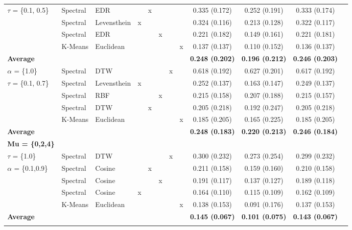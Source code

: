 \begin{table}[!htbp]
{\begin{tabular}{@{\extracolsep{0pt}} lllccccccccc}
			$\tau$ =  \{0.1, 0.5\} & Spectral & EDR &  & x &  &  &  & 0.335 (0.172) & 0.252 (0.191) & 0.333 (0.174) \\ 
			& Spectral & Levensthein & x &  &  &  &  & 0.324 (0.116) & 0.213 (0.128) & 0.322 (0.117) \\ 
			& Spectral & EDR &  &  & x &  &  & 0.221 (0.182) & 0.149 (0.161) & 0.221 (0.181) \\ 
			& K-Means & Euclidean &  &  &  &  & x & 0.137 (0.137) & 0.110 (0.152) & 0.136 (0.137) \\ 
			\hline
			\textbf{Average}  &  &  &  &  &  &  &  &  \textbf{0.248 (0.202)} &  \textbf{0.196 (0.212)} &  \textbf{0.246 (0.203)} \\ 
			\hline
			$\alpha$ = \{1.0\} & Spectral & DTW &  &  &  & x &  & 0.618 (0.192) & 0.627 (0.201) & 0.617 (0.192) \\ 
			$\tau$ = \{0.1, 0.7\} & Spectral & Levensthein & x &  &  &  &  & 0.252 (0.137) & 0.163 (0.147) & 0.249 (0.137) \\ 
			& Spectral & RBF &  &  & x &  &  & 0.215 (0.158) & 0.207 (0.188) & 0.215 (0.157) \\ 
			& Spectral & DTW &  & x &  &  &  & 0.205 (0.218) & 0.192 (0.247) & 0.205 (0.218) \\ 
			& K-Means & Euclidean &  &  &  &  & x & 0.185 (0.205) & 0.165 (0.225) & 0.185 (0.205) \\ 
			\hline
			\textbf{Average} &  &  &  &  &  &  &  &  \textbf{0.248 (0.183)} &  \textbf{0.220 (0.213)} &  \textbf{0.246 (0.184)} \\ 
			\hline
			\textbf{Mu = \{0,2,4\}}\tnote{*} &  &  &  &  &  &  &  &  &  &  \\ 
			\hline
			$\tau$ = \{1.0\}  & Spectral & DTW &  &  &  & x &  & 0.300 (0.232) & 0.273 (0.254) & 0.299 (0.232) \\ 
			$\alpha$ = \{0.1,0.9\} & Spectral & Cosine &  & x &  &  &  & 0.211 (0.158) & 0.159 (0.160) & 0.210 (0.158) \\ 
			& Spectral & Cosine &  &  & x &  &  & 0.191 (0.117) & 0.137 (0.127) & 0.189 (0.118) \\ 
			& Spectral & Cosine & x &  &  &  &  & 0.164 (0.110) & 0.115 (0.109) & 0.162 (0.109) \\ 
			& K-Means & Euclidean &  &  &  &  & x & 0.138 (0.153) & 0.091 (0.176) & 0.137 (0.153) \\ 
			\hline
			\textbf{Average}  &  &  &  &  &  &  &  &  \textbf{0.145 (0.067)} &  \textbf{0.101 (0.075)} &  \textbf{0.143 (0.067)} \\ 
			\hline \\[-1.8ex] 

\end{tabular}}
\end{table}
